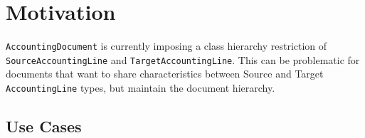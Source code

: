 \documentclass[12pt,notitlepage]{article}
\author{Leo Przybylski \\
\texttt{przybyls@u.arizona.edu}}
\begin{document}
  \maketitle
  \texonly{\tableofcontents \listoffigures} 
  \section{Motivation}
  \verb|AccountingDocument| is currently imposing a class hierarchy restriction of \verb|SourceAccountingLine|
  and \verb|TargetAccountingLine|. This can be problematic for documents that want to share characteristics 
  between Source and Target \verb|AccountingLine| types, but maintain the document hierarchy.
  
  \subsection{Use Cases}
\end{document}
